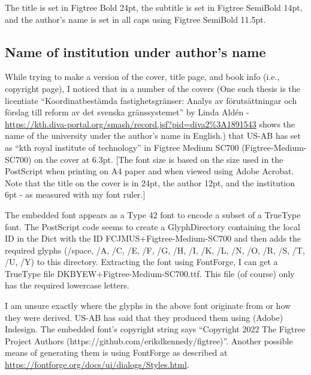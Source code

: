 \documentclass[12pt, twoside]{article}
\begin{document}
The title is set in Figtree Bold 24pt, the subtitle is set in Figtree SemiBold 14pt, and the author's name is set in all caps using Figtree SemiBold 11.5pt.

\subsection{Name of institution under author's name}
\label{sec:cycle3NameofInstitutionOnCover}

While trying to make a version of the cover, title page, and book info (i.e., copyright page), I noticed that in a number of the covers (One such thesis is the licentiate ``\foreignlanguage{swedish}{Koordinatbestämda fastighetsgränser: Analys av förutsättningar och förslag till reform av det svenska gränssystemet}'' by Linda Aldén - \url{https://kth.diva-portal.org/smash/record.jsf?pid=diva2%3A1891543} shows the name of the university under the author's name in English.)  that US-AB has set as ``kth royal institute of technology'' in Figtree Medium SC700 (Figtree-Medium-SC700) on the cover at 6.3pt. [The font size is based on the size used in the PostScript when printing on A4 paper and when viewed using Adobe Acrobat. Note that the title on the cover is in 24pt, the author 12pt, and the institution 6pt - as measured with my font ruler.]

The embedded font appears as a Type 42 font to encode a subset of a TrueType font. The PostScript code seems to create a GlyphDirectory containing the local ID in the Dict with the ID FCJMUS+Figtree-Medium-SC700 and then adds the required glyphs (/space, /A, /C, /E, /F, /G, /H, /I, /K, /L, /N, /O, /R, /S, /T, /U, /Y) to this directory. Extracting the font using FontForge, I can get a TrueType file DKBYEW+Figtree-Medium-SC700.ttf. This file (of course) only has the required lowercase letters.

I am unsure exactly where the glyphs in the above font originate from or how they were derived. US-AB has said that they produced them using (Adobe) Indesign. The embedded font's copyright string says ``Copyright 2022 The Figtree Project Authors (https://github.com/erikdkennedy/figtree)''. Another possible means of generating them is using FontForge as described at \url{https://fontforge.org/docs/ui/dialogs/Styles.html}.
\end{document}
